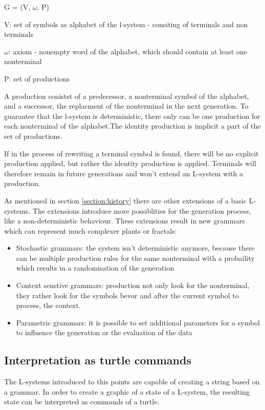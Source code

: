\documentclass[english]{cpp-hmwk}
\begin{document}
\begin{center}
G = (V, $\omega$, P)
\end{center}

V: set of symbols as alphabet of the l-system - consiting of terminals and non terminals

$\omega$: axiom - nonempty word of the alphabet, which should contain at least one nonterminal

P: set of productions

\medskip
\noindent A production conistst of a predecessor, a nonterminal symbol of the alphabet, and a successor, the replacment of the nonterminal in the next generation.
To guarantee that the l-system is deterministic, there only can be one production for each nonterminal of the alphabet.The identity production is implicit a part of the set of productions.\cite[Cf. Chapter 1.2, p.~4f.]{prusinkiewiczp.lindenmayera.2004}

\medskip

If in the process of rewriting a terminal symbol is found, there will be no explicit production applied, but rather the identity production is applied. Terminals will therefore remain in future generations and won't extend an L-system with a production.

\medskip

\noindent As mentioned in section \ref{section:history} there are other extensions of a basic L-systems. The extensions introduce more possiblities for the generation process, like a non-deterministic behaviour. These extensions result in new grammars which can represent much complexer plants or fractals:

\begin{itemize}
\item Stochastic grammars: the system isn't deterministic anymore, because there can be multiple production rules for the same nonterminal with a probaility which results in a randomisation of the generation
\item Context senstive grammars: production not only look for the nonterminal, they rather look for the symbols bevor and after the current symbol to process, the context.
\item Parametric grammars: it is possible to set additional parameters for a symbol to influence the generation or the evaluation of the data
\end{itemize}

\subsection{Interpretation as turtle commands}
\label{section:turtle}
The L-systems introduced to this points are capable of creating a string based on a grammar. In order to create a graphic of a state of a L-system, the resulting state can be interpreted as commands of a turtle.
\end{document}
